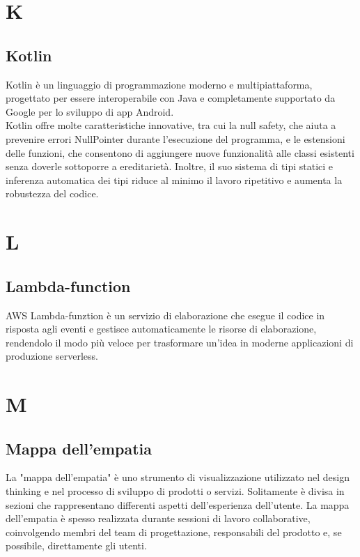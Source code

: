 \documentclass{article}
\begin{document}
\section{K}
\subsection{Kotlin}
Kotlin è un linguaggio di programmazione moderno e multipiattaforma, progettato per essere interoperabile con Java e completamente supportato da Google per lo sviluppo di app Android.\\
Kotlin offre molte caratteristiche innovative, tra cui la null safety, che aiuta a prevenire errori NullPointer durante l'esecuzione del programma, e le estensioni delle funzioni, che consentono di aggiungere nuove funzionalità alle classi esistenti senza doverle sottoporre a ereditarietà. Inoltre, il suo sistema di tipi statici e inferenza automatica dei tipi riduce al minimo il lavoro ripetitivo e aumenta la robustezza del codice.

\section{L}
\subsection{Lambda-function}
AWS Lambda-funztion è un servizio di elaborazione che esegue il codice in risposta agli eventi e gestisce automaticamente le risorse di elaborazione, rendendolo il modo più veloce per trasformare un'idea in moderne applicazioni di produzione serverless. 

\section{M}
\subsection {Mappa dell'empatia}
La "mappa dell'empatia" è uno strumento di visualizzazione utilizzato nel design thinking e nel processo di sviluppo di prodotti o servizi.
Solitamente è divisa in sezioni che rappresentano differenti aspetti dell'esperienza dell'utente.
La mappa dell'empatia è spesso realizzata durante sessioni di lavoro collaborative, coinvolgendo membri del team di progettazione, responsabili del prodotto e, se possibile, direttamente gli utenti.
\end{document}
